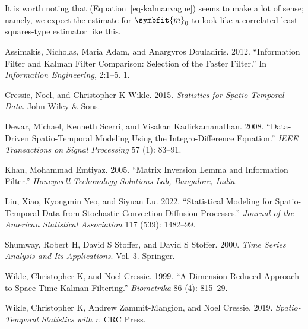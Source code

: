 \documentclass[
]{report}
\newlength{\cslhangindent}
\newenvironment{CSLReferences}[2] %
 {\begin{list}{}{%
  \setlength{\itemindent}{0pt}
  \setlength{\leftmargin}{0pt}
  \setlength{\parsep}{0pt}
  \ifodd #1
   \setlength{\leftmargin}{\cslhangindent}
   \setlength{\itemindent}{-1\cslhangindent}
  \fi
  \setlength{\itemsep}{#2\baselineskip}}}
 {\end{list}}
\newcommand{\bv}[1]{\symbfit{#1}}
\theoremstyle{plain}
\theoremstyle{plain}
\theoremstyle{plain}
\theoremstyle{remark}
\begin{document}
It is worth noting that (Equation~\ref{eq-kalmanvague}) seems to make a
lot of sense; namely, we expect the estimate for \(\bv m_0\) to look
like a correlated least squares-type estimator like this.

\label{refs}
\begin{CSLReferences}{1}{0}
Assimakis, Nicholas, Maria Adam, and Anargyros Douladiris. 2012.
{``Information Filter and Kalman Filter Comparison: Selection of the
Faster Filter.''} In \emph{Information Engineering}, 2:1--5. 1.

Cressie, Noel, and Christopher K Wikle. 2015. \emph{Statistics for
Spatio-Temporal Data}. John Wiley \& Sons.

Dewar, Michael, Kenneth Scerri, and Visakan Kadirkamanathan. 2008.
{``Data-Driven Spatio-Temporal Modeling Using the Integro-Difference
Equation.''} \emph{IEEE Transactions on Signal Processing} 57 (1):
83--91.

Khan, Mohammad Emtiyaz. 2005. {``Matrix Inversion Lemma and Information
Filter.''} \emph{Honeywell Techonology Solutions Lab, Bangalore, India}.

Liu, Xiao, Kyongmin Yeo, and Siyuan Lu. 2022. {``Statistical Modeling
for Spatio-Temporal Data from Stochastic Convection-Diffusion
Processes.''} \emph{Journal of the American Statistical Association} 117
(539): 1482--99.

Shumway, Robert H, David S Stoffer, and David S Stoffer. 2000.
\emph{Time Series Analysis and Its Applications}. Vol. 3. Springer.

Wikle, Christopher K, and Noel Cressie. 1999. {``A Dimension-Reduced
Approach to Space-Time Kalman Filtering.''} \emph{Biometrika} 86 (4):
815--29.

Wikle, Christopher K, Andrew Zammit-Mangion, and Noel Cressie. 2019.
\emph{Spatio-Temporal Statistics with r}. CRC Press.

\end{CSLReferences}
\end{document}
